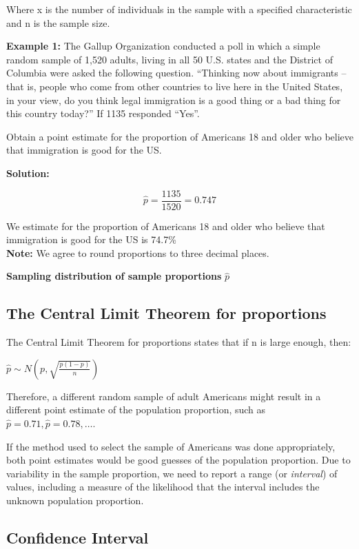 \documentclass[
]{book}
\begin{document}
Where x is the number of individuals in the sample with a specified characteristic and n is the sample size.

\textbf{Example 1:} The Gallup Organization conducted a poll in which a simple random sample of 1,520 adults, living in all 50 U.S. states and the District of Columbia were asked the following question. ``Thinking now about immigrants -- that is, people who come from other countries to live here in the United States, in your view, do you think legal immigration is a good thing or a bad thing for this country today?'' If 1135 responded ``Yes''.

Obtain a point estimate for the proportion of Americans 18 and older who believe that immigration is good for the US.

\textbf{Solution:}

\[\hat{p}= \frac{1135}{1520} = 0.747\]

We estimate for the proportion of Americans 18 and older who believe that immigration is good for the US is 74.7\%\\
\textbf{Note:} We agree to round proportions to three decimal places.

\textbf{Sampling distribution of sample proportions} \(\hat{p}\)

\subsection{The Central Limit Theorem for proportions}\label{the-central-limit-theorem-for-proportions}

The Central Limit Theorem for proportions states that if n is large enough, then:

\(\hat{p}\sim N \left( p, \sqrt{\frac{p(1-p)}{n}} \right)\)

Therefore, a different random sample of adult Americans might result in a different point estimate of the population proportion, such as \(\hat{p}= 0.71, \hat{p}= 0.78, \ldots\).

If the method used to select the sample of Americans was done appropriately, both point estimates would be good guesses of the population proportion. Due to variability in the sample proportion, we need to report a range (or \emph{interval}) of values, including a measure of the likelihood that the interval includes the unknown population proportion.

\subsection{Confidence Interval}\label{confidence-interval}
\end{document}
